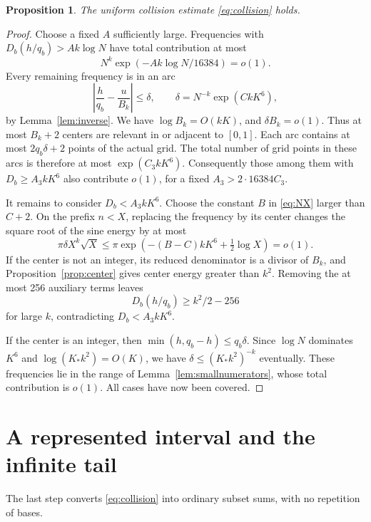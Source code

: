 \documentclass[11pt]{amsart}
\numberwithin{equation}{section}
\newtheorem{proposition}[theorem]{Proposition}
\theoremstyle{remark}
\begin{document}
\begin{proposition}\label{prop:collision}
The uniform collision estimate \eqref{eq:collision} holds.
\end{proposition}
\begin{proof}
Choose a fixed \(A\) sufficiently large.
Frequencies with \(D_b(h/q_b)>Ak\log N\) have total contribution at most
\[
 N^k\exp(-Ak\log N/16384)=o(1).
\]
Every remaining frequency is in an arc
\[
 \left|\frac h{q_b}-\frac u{B_k}\right|\le\delta,\qquad
 \delta=N^{-k}\exp(CkK^6),
\]
by Lemma~\ref{lem:inverse}.
We have \(\log B_k=O(kK)\), and \(\delta B_k=o(1)\).
Thus at most \(B_k+2\) centers are relevant in or adjacent to \([0,1]\).
Each arc contains at most \(2q_b\delta+2\) points of the actual grid.
The total number of grid points in these arcs is therefore at most
\(\exp(C_3kK^6)\).
Consequently those among them with \(D_b\ge A_3kK^6\) also contribute
\(o(1)\), for a fixed \(A_3>2\cdot16384C_3\).

It remains to consider \(D_b<A_3kK^6\).
Choose the constant \(B\) in \eqref{eq:NX} larger than \(C+2\).
On the prefix \(n<X\), replacing the frequency by its center changes
the square root of the sine energy by at most
\[
 \pi\delta X^k\sqrt X
 \le \pi\exp(-(B-C)kK^6+\tfrac12\log X)=o(1).
\]
If the center is not an integer, its reduced denominator is a divisor
of \(B_k\), and Proposition~\ref{prop:center} gives center energy
greater than \(k^2\). Removing the at most 256 auxiliary terms leaves
\[
 D_b(h/q_b)\ge k^2/2-256
\]
for large \(k\), contradicting \(D_b<A_3kK^6\).

If the center is an integer, then
\(\min(h,q_b-h)\le q_b\delta\).
Since \(\log N\) dominates \(K^6\) and
\(\log(K_*k^2)=O(K)\), we have
\(\delta\le(K_*k^2)^{-k}\) eventually.
These frequencies lie in the range of Lemma~\ref{lem:smallnumerators},
whose total contribution is \(o(1)\).
All cases have now been covered.
\end{proof}

\section{A represented interval and the infinite tail}\label{sec:completion}

The last step converts \eqref{eq:collision} into ordinary subset sums,
with no repetition of bases.
\end{document}
